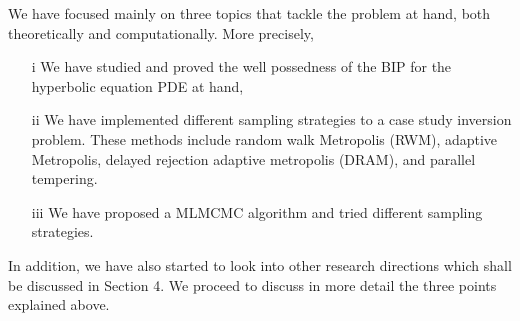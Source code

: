 We have focused mainly on three topics that tackle the problem at hand, both theoretically and computationally. More precisely, \begin{itemize}
	\item[i] We have studied and proved the well possedness of the BIP for the hyperbolic equation PDE at hand,
	\item[ii] We have implemented different sampling strategies to a case study inversion problem. These methods include random walk  Metropolis (RWM), adaptive Metropolis, delayed rejection adaptive metropolis (DRAM), and parallel tempering. 
	\item[iii] We have proposed a MLMCMC algorithm and tried different sampling strategies. 
	\end{itemize}
 In addition, we have also started to look  into other research directions which shall be discussed in Section 4. We proceed to discuss in more detail the three points explained above. 
